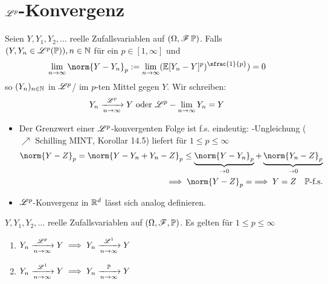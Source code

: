 \section{$\Ln{p}$-Konvergenz}
\begin{definition}[$\Ln{p}$-Konvergenz]
	Seien $Y,Y_1,Y_2, \dots$ reelle Zufallsvariablen auf $(\Omega,\mathscr F\,\mathbb{P})$. Falls $(Y,Y_n \in \mathscr{L}^{p}(\mathbb{P})), n\in \mathbb{N}$ für ein $p \in [1,\infty]$ und
	\begin{align*}
		\lim_{n \to \infty} \norm{Y-Y_n}_p := \lim_{n \to \infty} 
		(\E[Y_n - Y]^p)^{\sfrac{1}{p}}) = 0
	\end{align*}
	so  $(Y_n)_{n \in \mathbb{N}}$ in $\Ln{p}$/ im $p$-ten Mittel gegen $Y$. Wir schreiben:
	\begin{align*}
		Y_n \xrightarrow[n \to \infty]{\mathscr{L}^{p}} Y \text{ oder } \mathscr{L}^{p}-\lim_{n \to \infty} Y_n = Y
	\end{align*}
\end{definition}
\begin{*remark}
	\begin{itemize}
		\item Der Grenzwert einer $\Ln{p}$-konvergenten Folge ist f.s. eindeutig: -Ungleichung ($\nearrow$ Schilling MINT, Korollar 14.5) liefert für $1 \le p \le \infty$
		\begin{align*}
			\norm{Y-Z}_p = \norm{Y-Y_n+Y_n - Z}_p \le \underbrace{\norm{Y-Y_n}_p}_{\to 0} + 
			\underbrace{\norm{Y_n-Z}_p}_{\to 0}\\
			\implies \norm{Y-Z}_p = \implies Y=Z \quad \P\text{-f.s.}
		\end{align*}
		\item $\Ln{p}$-Konvergenz in $\mathbb{R}^d$ lässt sich analog definieren.
	\end{itemize}
\end{*remark}
\begin{lemma}
	$Y,Y_1,Y_2,\dots$ reelle Zufallsvariablen auf $(\Omega,\mathscr F,\mathbb{P})$. Es gelten für $1 \le p \le \infty$
	\begin{enumerate}
		\item $Y_n \xrightarrow[n \to \infty]{\mathscr{L}^{p}} Y \implies Y_n \xrightarrow[n \to \infty]{\mathscr{L}^{1}} Y$
		\item $Y_n \xrightarrow[n \to \infty]{\mathscr{L}^{1}} Y\implies Y_n \xrightarrow[n \to \infty]{\mathbb{P}} Y$
	\end{enumerate}
\end{lemma}
